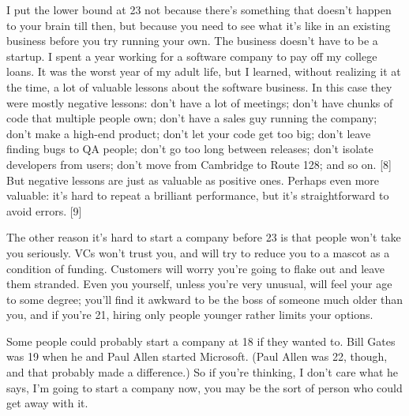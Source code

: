 I
                    put the lower bound at 23 not because there's something that
                    doesn't happen to your brain till then, but because you need
                    to see what it's like in an existing business before you try
                    running your own. The business doesn't have to be a startup.
                    I spent a year working for a software company to pay off my
                    college loans. It was the worst year of my adult life, but I
                    learned, without realizing it at the time, a lot of valuable
                    lessons about the software business. In this case they were
                    mostly negative lessons: don't have a lot of meetings; don't
                    have chunks of code that multiple people own; don't have a
                    sales guy running the company; don't make a high-end
                    product; don't let your code get too big; don't leave
                    finding bugs to QA people; don't go too long between
                    releases; don't isolate developers from users; don't move
                    from Cambridge to Route 128; and so on. [8] But negative
                    lessons are just as valuable as positive ones. Perhaps even
                    more valuable: it's hard to repeat a brilliant performance,
                    but it's straightforward to avoid errors. [9]

The
                    other reason it's hard to start a company before 23 is that
                    people won't take you seriously. VCs won't trust you, and
                    will try to reduce you to a mascot as a condition of
                    funding. Customers will worry you're going to flake out and
                    leave them stranded. Even you yourself, unless you're very
                    unusual, will feel your age to some degree; you'll find it
                    awkward to be the boss of someone much older than you, and
                    if you're 21, hiring only people younger rather limits your
                    options.

Some people could probably start a
                    company at 18 if they wanted to. Bill Gates was 19 when he
                    and Paul Allen started Microsoft. (Paul Allen was 22,
                    though, and that probably made a difference.) So if you're
                    thinking, I don't care what he says, I'm going to start a
                    company now, you may be the sort of person who could get
                    away with it.

